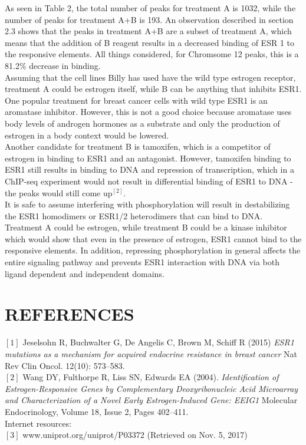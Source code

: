 \documentclass[a4paper,11pt]{article}
\begin{document}
\vspace{0.5 cm}
As seen in Table 2, the total number of peaks for treatment A is 1032, while the number of peaks for treatment A+B is 193. An observation described in section 2.3 shows that the peaks in treatment A+B are a subset of treatment A, which means that the addition of B reagent results in a decreased binding of ESR 1 to the responsive elements. All things considered, for Chromsome 12 peaks, this is a 81.2\% decrease in binding.\\
\vspace{0.5 cm}							 
Assuming that the cell lines Billy has used have the wild type estrogen receptor, treatment A could be estrogen itself, while B can be anything that inhibits ESR1.\\
\vspace{0.5 cm}
One popular treatment for breast cancer cells with wild type ESR1 is an aromatase inhibitor. However, this is not a good choice because aromatase uses body levels of androgen hormones as a substrate and only the production of estrogen in a body context would be lowered.\\
\vspace{0.5 cm}
Another candidate for treatment B is tamoxifen, which is a competitor of estrogen in binding to ESR1 and an antagonist. However, tamoxifen binding to ESR1 still results in binding to DNA and repression of transcription, which in a ChIP-seq experiment would not result in differential binding of ESR1 to DNA - the peaks would still come up${^{[2]}}$.\\
\vspace{0.5 cm}
It is safe to assume interfering with phosphorylation will result in destabilizing the ESR1 homodimers or ESR1/2 heterodimers that can bind to DNA. Treatment A could be estrogen, while treatment B could be a kinase inhibitor which would show that even in the presence of estrogen, ESR1 cannot bind to the responsive elements. In addition, repressing phosphorylation in general affects the entire signaling pathway and prevents ESR1 interaction with DNA via both ligand dependent and independent domains.
\pagebreak
\section*{\footnotesize REFERENCES}

$[1]$ Jeselsohn R, Buchwalter G, De Angelis C, Brown M, Schiff R (2015) \textit{ESR1 mutations as a mechanism for acquired endocrine resistance in breast cancer} Nat Rev Clin Oncol. 12(10): 573–583.\\
\vspace{0.5 cm}
$[2]$ Wang DY, Fulthorpe R, Liss SN, Edwards EA (2004). \textit{Identification of Estrogen-Responsive Genes by Complementary Deoxyribonucleic Acid Microarray and Characterization of a Novel Early Estrogen-Induced Gene: EEIG1} Molecular Endocrinology, Volume 18, Issue 2, Pages 402–411.\\
\vspace{0.5 cm}
Internet resources:\\
$[3]$ www.uniprot.org/uniprot/P03372 (Retrieved on Nov. 5, 2017)
\end{document}
